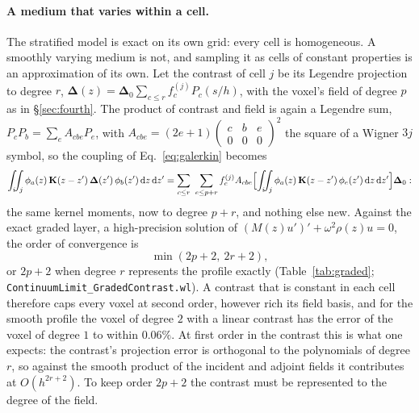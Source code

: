 \documentclass[11pt,a4paper]{article}
\newcommand{\bK}{\mathbf{K}}
\newcommand{\bD}{\boldsymbol{\Delta}}
\newcommand{\nb}[1]{\texttt{#1}}
\newcommand{\dd}{\mathrm{d}}
\begin{document}
\paragraph{A medium that varies within a cell.} The stratified model is exact on its own grid: every
cell is homogeneous. A smoothly varying medium is not, and sampling it as cells of constant
properties is an approximation of its own. Let the contrast of cell $j$ be its Legendre projection to
degree $r$, $\bD(z)=\bD_0\sum_{c\le r}f_c^{(j)}P_c(s/h)$, with the voxel's field of degree $p$ as in
\S\ref{sec:fourth}. The product of contrast and field is again a Legendre sum,
$P_cP_b=\sum_eA_{cbe}P_e$, with $A_{cbe}=(2e+1)\left(\begin{smallmatrix}c&b&e\\0&0&0\end{smallmatrix}\right)^2$
the square of a Wigner $3j$ symbol, so the coupling of Eq.~\eqref{eq:galerkin} becomes
\begin{equation}\label{eq:gradedcoupling}
  \int_i\!\!\int_j\phi_a(z)\,\bK(z-z')\,\bD(z')\,\phi_b(z')\,\dd z\,\dd z'
  =\sum_{c\le r}\ \sum_{e\le p+r}f_c^{(j)}A_{cbe}
  \Bigl[\int_i\!\!\int_j\phi_a(z)\,\bK(z-z')\,\phi_e(z')\,\dd z\,\dd z'\Bigr]\bD_0:
\end{equation}
the same kernel moments, now to degree $p+r$, and nothing else new. Against the exact graded layer, a
high-precision solution of $(M(z)u')'+\omega^2\rho(z)u=0$, the order of convergence is
\begin{equation}\label{eq:graded}
  \min(2p+2,\ 2r+2),
\end{equation}
or $2p+2$ when degree $r$ represents the profile exactly (Table~\ref{tab:graded};
\nb{ContinuumLimit\_GradedContrast.wl}). A contrast that is constant in each cell therefore caps every
voxel at second order, however rich its field basis, and for the smooth profile the voxel of degree
$2$ with a linear contrast has the error of the voxel of degree $1$ to within $0.06\%$. At first order in
the contrast this is what one expects: the contrast's projection error is orthogonal to the polynomials
of degree $r$, so against the smooth product of the incident and adjoint fields it contributes at
$O(h^{2r+2})$. To keep order $2p+2$ the contrast must be represented to the degree of the field.
\end{document}
